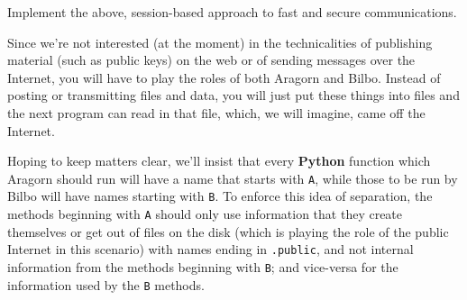 \documentclass[12pt,letterpaper]{amsbook}
\theoremstyle{definition}
\theoremstyle{remark}
\numberwithin{figure}{section}
\numberwithin{exercise}{chapter}
\numberwithin{section}{chapter}
\numberwithin{equation}{section}
\numberwithin{table}{subsection}
\newcommand{\code}[1]{\colorbox{lg}{\texttt{#1}}}
\newcommand{\Python}{{\textbf{\ix{Python}}}}
\newcommand{\ix}[1]{{#1}\index{#1}}
\begin{document}
\vskip4mm
\begin{BTtcb}[label=bt:sessionbasedCS]{}{}
Implement the above, \ix{session}-based approach to fast and secure
communications.

Since we're not interested (at the moment) in the technicalities of publishing
material (such as public keys) on the web or of sending messages over the
Internet, you will have to play the roles of both Aragorn and Bilbo.  Instead
of posting or transmitting files and data, you will just put these things into
files and the next program can read in that file, which, we will imagine, came
off the Internet.

Hoping to keep matters clear, we'll insist that every {\Python} function which
Aragorn should run will have a name that starts with \code{A}, while those to be
run by Bilbo will have names starting with \code{B}.  To enforce this idea of
separation, the methods beginning with \code{A} should only use information
that they create themselves or get out of files on the disk (which is playing
the role of the public Internet in this scenario) with names ending in
\code{.public}, and not internal information from the methods beginning with
\code{B}; and vice-versa for the information used by the \code{B} methods.


\end{BTtcb}
\end{document}
